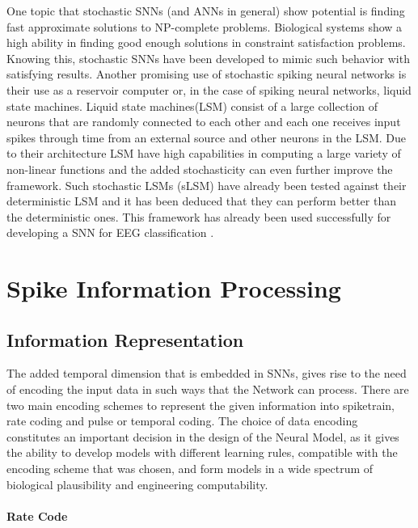 \documentclass[12pt]{report}
\begin{document}
One topic that stochastic SNNs (and ANNs in general) show potential is finding fast approximate solutions to NP-complete problems. Biological systems show a high ability in finding good enough solutions in constraint satisfaction problems. Knowing this, stochastic SNNs have been developed to mimic such behavior with satisfying results\cite{Fonseca2017}. Another promising use of stochastic spiking neural networks is their use as a reservoir computer or, in the case of spiking neural networks, liquid state machines. Liquid state machines(LSM) consist of a large collection of neurons that are randomly connected to each other and each one receives input spikes through time from an external source and other neurons in the LSM. Due to their architecture LSM have high capabilities in computing a large variety of non-linear functions and the added stochasticity can even further improve the framework. Such stochastic LSMs (sLSM) have already been tested against their deterministic LSM \cite{IEEE2011} and it has been deduced that they can perform better than the deterministic ones. This framework has already been used successfully for developing a SNN for EEG classification \cite{Nuntalid2011}.

\bigskip
\chapter{Spike Information Processing}
\section{Information Representation}

The added temporal dimension that is embedded in SNNs, gives rise to the need of encoding the input data in such ways that the Network can process. There are two main encoding schemes to represent the given information into spiketrain, rate coding and pulse or temporal coding. The choice of data encoding constitutes an important decision in the design of the Neural Model, as it gives the ability to develop models with different learning rules, compatible with the encoding scheme that was chosen, and form models in a wide spectrum of biological plausibility and engineering computability.

\subsubsection{Rate Code}
\end{document}
